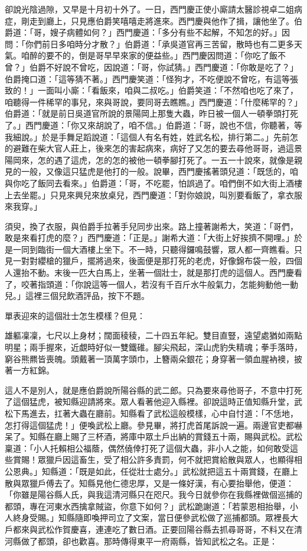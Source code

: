 \begin{showcontents}{}
卻說光陰過隙，又早是十月初十外了。一日，西門慶正使小廝請太醫診視卓二姐病症，剛走到廳上，只見應伯爵笑嘻嘻走將進來。西門慶與他作了揖，讓他坐了。伯爵道：「哥，嫂子病體如何？」西門慶道：「多分有些不起解，不知怎的好。」因問：「你們前日多咱時分才散？」伯爵道：「承吳道官再三苦留，散時也有二更多天氣。咱醉的要不的，倒是哥早早來家的便益些。」西門慶因問道：「你吃了飯不曾？」伯爵不好說不曾吃，因說道：「哥，你試猜。」西門慶道：「你敢是吃了？」伯爵掩口道：「這等猜不著。」西門慶笑道：「怪狗才，不吃便說不曾吃，有這等張致的！」一面叫小廝：「看飯來，咱與二叔吃。」伯爵笑道：「不然咱也吃了來了，咱聽得一件稀罕的事兒，來與哥說，要同哥去瞧瞧。」西門慶道：「什麼稀罕的？」伯爵道：「就是前日吳道官所說的景陽岡上那隻大蟲，昨日被一個人一頓拳頭打死了。」西門慶道：「你又來胡說了，咱不信。」伯爵道：「哥，說也不信，你聽著，等我細說。」於是手舞足蹈說道：「這個人有名有姓，姓武名松，排行第二。」先前怎的避難在柴大官人莊上，後來怎的害起病來，病好了又怎的要去尋他哥哥，過這景陽岡來，怎的遇了這虎，怎的怎的被他一頓拳腳打死了。一五一十說來，就像是親見的一般，又像這只猛虎是他打的一般。說畢，西門慶搖著頭兒道：「既恁的，咱與你吃了飯同去看來。」伯爵道：「哥，不吃罷，怕誤過了。咱們倒不如大街上酒樓上去坐罷。」只見來興兒來放桌兒，西門慶道：「對你娘說，叫別要看飯了，拿衣服來我穿。」

須臾，換了衣服，與伯爵手拉著手兒同步出來。路上撞著謝希大，笑道：「哥們，敢是來看打虎的麼？」西門慶道：「正是。」謝希大道：「大街上好挨擠不開哩。」於是一同到臨街一個大酒樓上坐下。不一時，只聽得鑼鳴鼓響，眾人都一齊瞧看。只見一對對纓槍的獵戶，擺將過來，後面便是那打死的老虎，好像錦布袋一般，四個人還抬不動。末後一匹大白馬上，坐著一個壯士，就是那打虎的這個人。西門慶看了，咬著指頭道：「你說這等一個人，若沒有千百斤水牛般氣力，怎能夠動他一動兒。」這裡三個兒飲酒評品，按下不題。

單表迎來的這個壯士怎生模樣？但見：

雄軀凜凜，七尺以上身材；闊面稜稜，二十四五年紀。雙目直豎，遠望處猶如兩點明星；兩手握來，近覷時好似一雙鐵碓。腳尖飛起，深山虎豹失精魂；拳手落時，窮谷熊羆皆喪魄。頭戴著一頂萬字頭巾，上簪兩朵銀花；身穿著一領血腥衲襖，披著一方紅錦。

這人不是別人，就是應伯爵說所陽谷縣的武二郎。只為要來尋他哥子，不意中打死了這個猛虎，被知縣迎請將來。眾人看著他迎入縣裡。卻說這時正值知縣升堂，武松下馬進去，扛著大蟲在廳前。知縣看了武松這般模樣，心中自忖道：「不恁地，怎打得這個猛虎！」便喚武松上廳。參見畢，將打虎首尾訴說一遍。兩邊官吏都嚇呆了。知縣在廳上賜了三杯酒，將庫中眾土戶出納的賞錢五十兩，賜與武松。武松稟道：「小人托賴相公福蔭，偶然僥倖打死了這個大蟲，非小人之能，如何敢受這些賞賜！眾獵戶因這畜生，受了相公許多責罰，何不就把賞給散與眾人，也顯得相公恩典。」知縣道：「既是如此，任從壯士處分。」武松就把這五十兩賞錢，在廳上散與眾獵戶傅去了。知縣見他仁德忠厚，又是一條好漢，有心要抬舉他，便道：「你雖是陽谷縣人氏，與我這清河縣只在咫尺。我今日就參你在我縣裡做個巡捕的都頭，專在河東水西擒拿賊盜，你意下如何？」武松跪謝道：「若蒙恩相抬舉，小人終身受賜。」知縣隨即喚押司立了文案，當日便參武松做了巡捕都頭。眾裡長大戶都來與武松作賀慶喜，連連吃了數日酒。正要回陽谷縣去抓尋哥哥，不料又在清河縣做了都頭，卻也歡喜。那時傳得東平一府兩縣，皆知武松之名。正是：


\end{showcontents}
